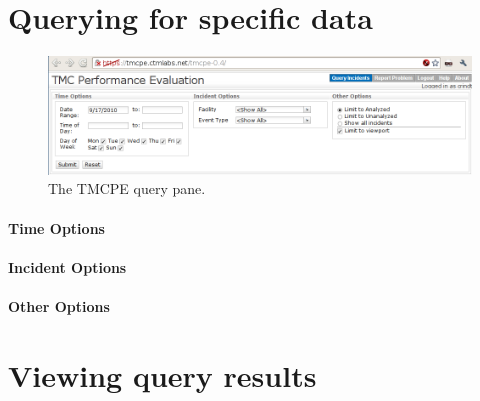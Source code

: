 \documentclass[12pt]{report}
\begin{document}


\section{Querying for specific data}
\label{sec:ui-query}

\begin{figure}[t]
  \begin{center}
    \includegraphics[width=\textwidth]{images/tmcpe-query.png}
    \caption{The TMCPE query pane.}
    \label{fig:tmcpe-query}
  \end{center}
\end{figure}


\paragraph{Time Options}

\paragraph{Incident Options}

\paragraph{Other Options}




\section{Viewing query results}
\label{sec:ui-viewing}
\end{document}
